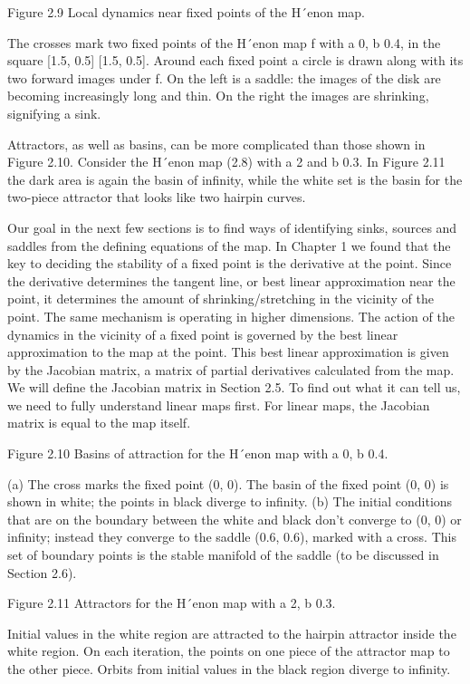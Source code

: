 \documentclass[12pt]{article}
\begin{document}
Figure 2.9 Local dynamics near ﬁxed points of the H´enon map.

The crosses mark two ﬁxed points of the H´enon map f with a  0, b  0.4, in the square [1.5, 0.5] [1.5, 0.5]. Around each ﬁxed point 
a circle is drawn along with its two forward images under f. On the left is a saddle: the images of the disk are becoming 
increasingly long and thin. On the right the images are shrinking, signifying a sink.

Attractors, as well as basins, can be more complicated than those shown in Figure 2.10. Consider the H´enon map (2.8) with a  2 and b  
0.3. In Figure 2.11 the dark area is again the basin of inﬁnity, while the white set is the basin for the two-piece attractor that 
looks like two hairpin curves.

Our goal in the next few sections is to ﬁnd ways of identifying sinks, sources and saddles from the deﬁning equations of the map. 
In Chapter 1 we found that the key to deciding the stability of a ﬁxed point is the derivative at the point. Since the derivative 
determines the tangent line, or best linear approximation near the point, it determines the amount of shrinking/stretching in the 
vicinity of the point. The same mechanism is operating in higher dimensions. The action of the dynamics in the vicinity of a ﬁxed 
point is governed by the best linear approximation to the map at the point. This best linear approximation is given by the Jacobian 
matrix, a matrix of partial derivatives calculated from the map. We will deﬁne the Jacobian matrix in Section 2.5. To ﬁnd out what 
it can tell us, we need to fully understand linear maps ﬁrst. For linear maps, the Jacobian matrix is equal to the map itself.

Figure 2.10 Basins of attraction for the H´enon map with a  0, b  0.4.

(a) The cross marks the ﬁxed point (0, 0). The basin of the ﬁxed point (0, 0) is shown in white; the points in black diverge to 
inﬁnity. (b) The initial conditions that are on the boundary between the white and black don’t converge to (0, 0) or inﬁnity; 
instead they converge to the saddle (0.6, 0.6), marked with a cross. This set of boundary points is the stable manifold of the saddle 
(to be discussed in Section 2.6).

Figure 2.11 Attractors for the H´enon map with a  2, b  0.3.

Initial values in the white region are attracted to the hairpin attractor inside the white region. On each iteration, the points on 
one piece of the attractor map to the other piece. Orbits from initial values in the black region diverge to inﬁnity.
\end{document}
